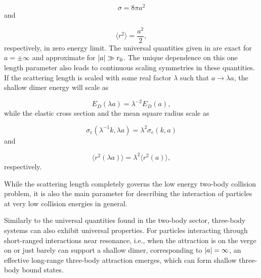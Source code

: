 \begin{equation}\label{elasticcross}
\sigma = 8\pi a^2
\end{equation}
and

\begin{equation}\label{meanradius}
\langle r^2\rangle = \frac{a^2}{2},
\end{equation}
respectively, in zero energy limit. The universal quantities given in  are exact for $a=\pm \infty$ and approximate for $\lvert a\rvert\gg r_0$. The unique dependence on this one length parameter also leads to continuous scaling symmetries in these quantities. If the scattering length is scaled with some real factor $\lambda$ such that $a \to \lambda a$, the shallow dimer energy will scale as 

\begin{equation}
E_D(\lambda a) = \lambda^{-2}E_D(a),
\end{equation}    
while the elastic cross section and the mean square radius scale as 

\begin{equation}
\sigma_e(\lambda^{-1}k,\lambda a) = \lambda^2 \sigma_e(k,a)
\end{equation}
and

\begin{equation}
\langle r^2(\lambda a)\rangle = \lambda^2 \langle r^2(a)\rangle ,
\end{equation}
respectively. 

While the scattering length completely governs the low energy two-body collision problem, it is also the main parameter for describing the interaction of particles at very low collision energies in general. 

Similarly to the universal quantities found in the two-body sector, three-body systems can also exhibit universal properties. For particles interacting through short-ranged interactions near resonance, i.e., when the attraction is on the verge on or just barely can support a shallow dimer, corresponding to $\lvert a\rvert=\infty$, an effective long-range three-body attraction emerges, which can form shallow three-body bound states.

